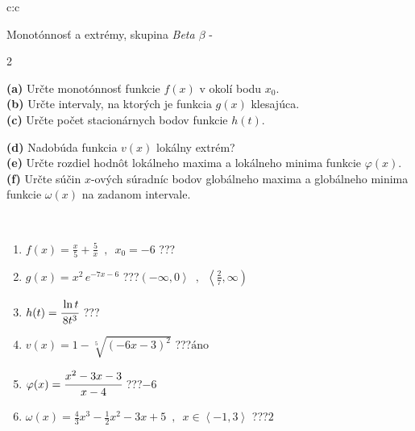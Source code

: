 \documentclass[10pt]{report}
\begin{document}
\newpage
\thispagestyle{empty}
\begin{tabular}{c:c}
\begin{minipage}[c][104.5mm][t]{0.5\linewidth}
\begin{center}
\vspace{7mm}
{\huge Monotónnosť a extrémy, skupina \textit{Beta $\beta$} -}\\[5mm]
\begin{minipage}{0.95\linewidth}
\begin{center}
{\small \begin{multicols}{2} \raggedright
\textbf{(a)} Určte monotónnosť funkcie \(f(x)\) v okolí bodu \(x_0\). \\[1mm]
\textbf{(b)} Určte intervaly, na ktorých je funkcia \(g(x)\) klesajúca. \\[1mm]
\textbf{(c)} Určte počet stacionárnych bodov funkcie \(h(t)\). \par \columnbreak
\textbf{(d)} Nadobúda funkcia \(v(x)\) lokálny extrém? \\[1mm]
\textbf{(e)} Určte rozdiel hodnôt lokálneho maxima a lokálneho minima funkcie \(\varphi(x)\). \\[1mm]
\textbf{(f)} Určte súčin \(x\)-ových súradníc bodov globálneho maxima a globálneho minima funkcie \(\omega(x)\) na zadanom intervale. \\[1mm]
\end{multicols}
}
\end{center}
\end{minipage}
\\[4mm]
\begin{minipage}{0.79\linewidth}
\begin{center}
\begin{varwidth}{\linewidth}
\begin{enumerate}
\normalsize
\item $f(x)=\frac{x}{5}+\frac{5}{x} \enspace , \enspace x_0=-6$\quad \dotfill\; ???\;\dotfill \quad {}
\item $g(x)=x^2\, e^{-7x-6}$\quad \dotfill\; ???\;\dotfill \quad $\left(-\infty , 0\right\rangle\enspace , \enspace \left\langle\frac{2}{7} , \infty\right)$
\item $h(t)=\cfrac{\ln t}{8t^3}$\quad \dotfill\; ???\;\dotfill {}
\item $v(x)=1-\sqrt[5]{(-6x-3)^2}$\quad \dotfill\; ???\;\dotfill \quad $\text{áno}$
\item $\varphi(x)=\cfrac{x^2-3x-3}{x-4}$\quad \dotfill\; ???\;\dotfill \quad $-6$
\item $\omega(x)=\frac{4}{3}x^3-\frac{1}{2}x^2-3x+5 \enspace , \enspace x\in\left\langle-1 , 3\right\rangle$\quad \dotfill\; ???\;\dotfill \quad $2$

\end{enumerate}
\end{varwidth}
\end{center}
\end{minipage}
\end{center}
\end{minipage}
\end{tabular}
\end{document}
